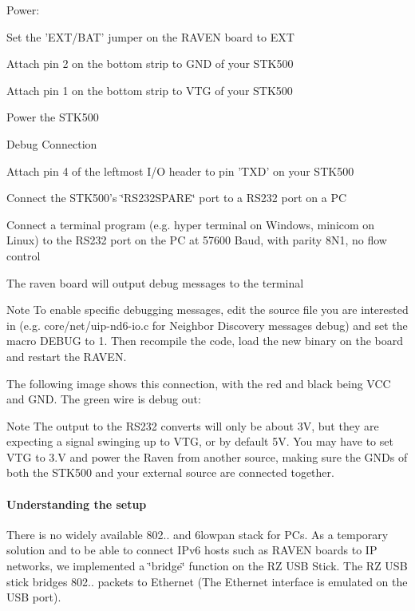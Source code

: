 \-Power\-: \begin{DoxyItemize}
\item \-Set the '\-E\-X\-T/\-B\-A\-T' jumper on the \-R\-A\-V\-E\-N board to \-E\-X\-T \item \-Attach pin 2 on the bottom strip to \-G\-N\-D of your \-S\-T\-K500 \item \-Attach pin 1 on the bottom strip to \-V\-T\-G of your \-S\-T\-K500 \item \-Power the \-S\-T\-K500\end{DoxyItemize}
\-Debug \-Connection \begin{DoxyItemize}
\item \-Attach pin 4 of the leftmost \-I/\-O header to pin '\-T\-X\-D' on your \-S\-T\-K500 \item \-Connect the \-S\-T\-K500's \char`\"{}\-R\-S232\-S\-P\-A\-R\-E\char`\"{} port to a \-R\-S232 port on a \-P\-C \item \-Connect a terminal program (e.\-g. hyper terminal on \-Windows, minicom on \-Linux) to the \-R\-S232 port on the \-P\-C at 57600 \-Baud, with parity 8\-N1, no flow control \item \-The raven board will output debug messages to the terminal\end{DoxyItemize}
\begin{DoxyNote}{\-Note}
\-To enable specific debugging messages, edit the source file you are interested in (e.\-g. core/net/uip-\/nd6-\/io.\-c for \-Neighbor \-Discovery messages debug) and set the macro \-D\-E\-B\-U\-G to 1. \-Then recompile the code, load the new binary on the board and restart the \-R\-A\-V\-E\-N.
\end{DoxyNote}
\-The following image shows this connection, with the red and black being \-V\-C\-C and \-G\-N\-D. \-The green wire is debug out\-:



\begin{DoxyNote}{\-Note}
\-The output to the \-R\-S232 converts will only be about 3\-V, but they are expecting a signal swinging up to \-V\-T\-G, or by default 5\-V. \-You may have to set \-V\-T\-G to 3.\-V and power the \-Raven from another source, making sure the \-G\-N\-Ds of both the \-S\-T\-K500 and your external source are connected together.
\end{DoxyNote}
\hypertarget{a00058_advanced_details}{}\paragraph{\-Understanding the setup}\label{a00058_advanced_details}
\-There is no widely available 802.. and 6lowpan stack for \-P\-Cs. \-As a temporary solution and to be able to connect \-I\-Pv6 hosts such as \-R\-A\-V\-E\-N boards to \-I\-P networks, we implemented a \char`\"{}bridge\char`\"{} function on the \-R\-Z \-U\-S\-B \-Stick. \-The \-R\-Z \-U\-S\-B stick bridges 802.. packets to \-Ethernet (\-The \-Ethernet interface is emulated on the \-U\-S\-B port).

